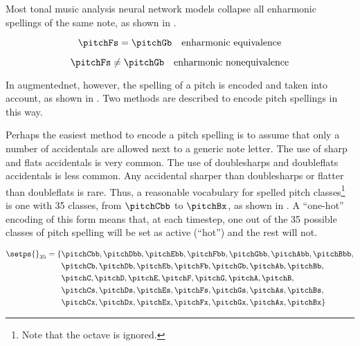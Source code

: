 
Most tonal music analysis neural network models collapse all
enharmonic spellings of the same note, as shown in
.

\begin{equation}
    \label{eq:enharmonic_equivalence}
    \pitchFs = \pitchGb \quad \text{enharmonic equivalence}
\end{equation}

\begin{equation}
    \label{eq:enharmonic_nonequivalence}
    \pitchFs \neq \pitchGb \quad \text{enharmonic nonequivalence}
\end{equation}

In \gls{augmentednet}, however, the spelling of a pitch is
encoded and taken into account, as shown in
. Two methods are described
to encode pitch spellings in this way.



Perhaps the easiest method to encode a pitch spelling is to
assume that only a number of accidentals are allowed next to
a generic note letter. The use of \gls{sharp} and
\glspl{flat} accidentals is very common. The use of
\glspl{doublesharp} and \glspl{doubleflat} accidentals is
less common. Any accidental sharper than \glspl{doublesharp}
or flatter than \glspl{doubleflat} is rare. Thus, a
reasonable vocabulary for spelled pitch
classes\footnote{Note that the octave is ignored.} is one
with 35 classes, from $\pitchCbb$ to $\pitchBx$, as shown in
. A ``one-hot'' encoding of this
form means that, at each timestep, one out of the 35
possible classes of pitch spelling will be set as active
(``hot'') and the rest will not.

\begin{equation}
    \label{eq:pitch_spelling_35}
    \begin{split}
    \setps{}_{35} = \{ & \pitchCbb, \pitchDbb, \pitchEbb, \pitchFbb, \pitchGbb, \pitchAbb, \pitchBbb, \\
    & \pitchCb, \pitchDb, \pitchEb, \pitchFb, \pitchGb, \pitchAb, \pitchBb, \\
    & \pitchC, \pitchD, \pitchE, \pitchF, \pitchG, \pitchA, \pitchB, \\
    & \pitchCs, \pitchDs, \pitchEs, \pitchFs, \pitchGs, \pitchAs, \pitchBs, \\
    & \pitchCx, \pitchDx, \pitchEx, \pitchFx, \pitchGx, \pitchAx, \pitchBx \}
    \end{split}
\end{equation}

